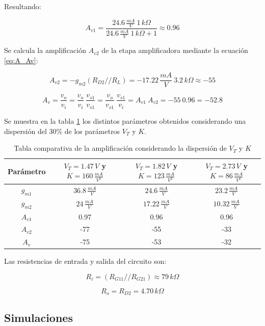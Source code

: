 \documentclass[10pt,spanish,a4paper,notitlepage]{article}
\begin{document}
Resultando:

\[ \displaystyle A_{v1} = \frac{24.6\,\unit{\frac{mA}{V}}\ 1\,\unit{k\Omega}}{24.6\,\unit{\frac{mA}{V}}\ 1\,\unit{k\Omega} + 1} 
\approx 0.96 \]

Se calcula la amplificación $A_{v2}$ de la etapa amplificadora mediante
la ecuación \ref{eq:A_Av}:

\[ \displaystyle A_{v2} = -g_{m2}(R_{D2}//R_L) =
-17.22\,\unit{\frac{mA}{V}}\ 3.2\,\unit{k\Omega}
\approx -55
\]


\[ \displaystyle A_v = \frac{v_o}{v_i}
= \frac{v_o}{v_i}\ \frac{v_{s1}}{v_{s1}}
= \frac{v_o}{v_{s1}}\ \frac{v_{s1}}{v_{i}}
= A_{v1}\ A_{v2}
= -55\ 0.96 = -52.8 \]

Se muestra en la tabla \ref{table:B_Av_dispersion}
los distintos parámetros obtenidos considerando una dispersión
del 30\% de los parámetros $V_T$ y $K$.

\begin{table}[H]
\centering
\begin{tabular}{|c|c|c|c|} 
\hline
Parámetro & $V_{T}=1.47\,\unit{V}$ y $K=160\,\unit{\frac{mA}{V^2}}$ & 
$V_{T}=1.82\,\unit{V}$ y $K=123\,\unit{\frac{mA}{V^2}}$ &
$V_{T}=2.73\,\unit{V}$ y $K=86\,\unit{\frac{mA}{V^2}}$  \\ \hline
$g_{m1}$ & $36.8\,\unit{\frac{mA}{V}}$ & $24.6\,\unit{\frac{mA}{V}}$ & $23.2\,\unit{\frac{mA}{V}}$\\ \hline
$g_{m2}$ & $24\,\unit{\frac{mA}{V}}$ & $17.22\,\unit{\frac{mA}{V}}$ & $10.32\,\unit{\frac{mA}{V}}$\\ \hline
$A_{v1}$ & 0.97 & 0.96 & 0.96 \\ \hline
$A_{v2}$ & -77 & -55 & -33 \\ \hline
$A_{v}$ & -75 & -53 & -32 \\ \hline
\end{tabular}
\caption{Tabla comparativa de la amplificación
considerando la dispersión de $V_T$ y $K$}
\label{table:B_Av_dispersion}
\end{table}


Las resistencias de entrada y salida del circuito son:

\[ \displaystyle R_i = (R_{G11} // R_{G21}) \approx 79\,\unit{k\Omega} \]

\[ \displaystyle R_o = R_{D2} = 4.70\,\unit{k\Omega} \]

\subsection{Simulaciones}
\end{document}
